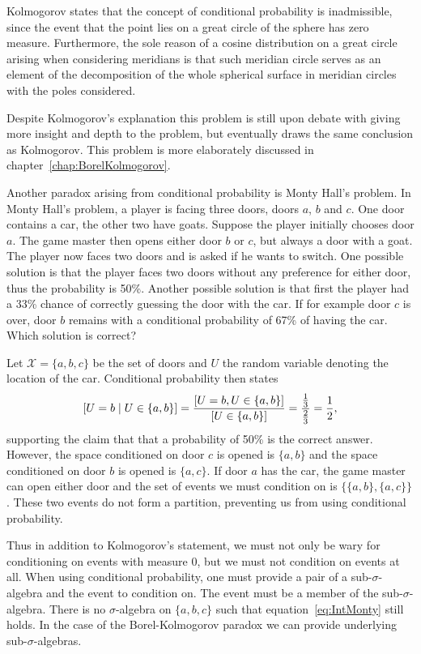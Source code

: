 \documentclass[twoside,a4paper]{report}
\theoremstyle{plain}
\theoremstyle{definition}
\theoremstyle{remark}
\numberwithin{equation}{chapter}
\let\P\relax
\DeclareMathOperator{\P}{\mathbb{P}}
\DeclareMathOperator{\1}{\mathbbm{1}}
\newcommand{\X}{\mathcal{X}}
\begin{document}
Kolmogorov states that the concept of conditional probability is inadmissible, since the event that the point lies on a great circle of the sphere has zero measure. Furthermore, the sole reason of a cosine distribution on a great circle arising when considering meridians is that such meridian circle serves as an element of the decomposition of the whole spherical surface in meridian circles with the poles considered. 

Despite Kolmogorov's explanation this problem is still upon debate with \cite{Gyenis17} giving more insight and depth to the problem, but eventually draws the same conclusion as Kolmogorov. This problem is more elaborately discussed in chapter~\ref{chap:BorelKolmogorov}.

Another paradox arising from conditional probability is Monty Hall's problem. In Monty Hall's problem, a player is facing three doors, doors $a$, $b$ and $c$. One door contains a car, the other two have goats. Suppose the player initially chooses door $a$. The game master then opens either door $b$ or $c$, but always a door with a goat. The player now faces two doors and is asked if he wants to switch. One possible solution is that the player faces two doors without any preference for either door, thus the probability is 50\%. Another possible solution is that first the player had a 33\% chance of correctly guessing the door with the car. If for example door $c$ is over, door $b$ remains with a conditional probability of 67\% of having the car. Which solution is correct?

Let $\X=\{a,b,c\}$ be the set of doors and $U$ the random variable denoting the location of the car. Conditional probability then states
\begin{equation}\label{eq:IntMonty}
\P[U=b\mid U\in\{a,b\}]=\frac{\P[U=b,U\in\{a,b\}]}{\P[U\in\{a,b\}]}=\frac{\frac{1}{3}}{\frac{2}{3}}=\frac{1}{2},
\end{equation}
supporting the claim that that a probability of 50\% is the correct answer. However, the space conditioned on door $c$ is opened is $\{a,b\}$ and the space conditioned on door $b$ is opened is $\{a,c\}$. If door $a$ has the car, the game master can open either door and the set of events we must condition on is $\{\{a,b\},\{a,c\}\}$. These two events do not form a partition, preventing us from using conditional probability.

Thus in addition to Kolmogorov's statement, we must not only be wary for conditioning on events with measure 0, but we must not condition on events at all. When using conditional probability, one must provide a pair of a sub-$\sigma$-algebra and the event to condition on. The event must be a member of the sub-$\sigma$-algebra. There is no $\sigma$-algebra on $\{a,b,c\}$ such that equation~\eqref{eq:IntMonty} still holds. In the case of the Borel-Kolmogorov paradox we can provide underlying sub-$\sigma$-algebras.
\end{document}
